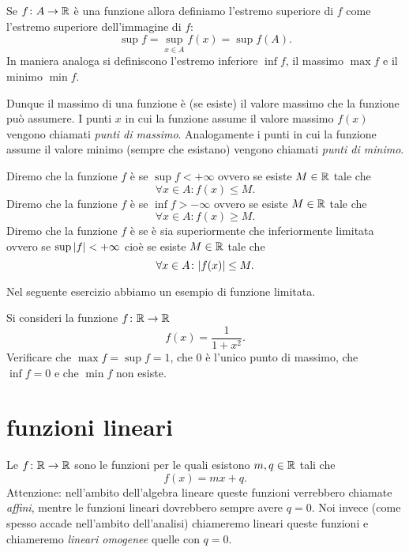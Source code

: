\begin{definition}
\label{def:funzione_limitata}%
Se $f\colon A \to \mathbb R$ è una funzione allora definiamo
l'estremo superiore di $f$ come l'estremo superiore
dell'immagine di $f$:
\[
  \sup f = \sup_{x\in A} f(x) = \sup f(A).
\]
In maniera analoga si definiscono l'estremo inferiore $\inf f$,
il massimo $\max f$ e il minimo $\min f$.

Dunque il massimo di una funzione è (se esiste) il valore massimo
che la funzione può assumere. I punti $x$ in cui
la funzione assume il valore massimo $f(x)$ vengono chiamati
\emph{punti di massimo}.
%
%
%
Analogamente i punti in cui la funzione
assume il valore minimo (sempre che esistano) vengono
chiamati \emph{punti di minimo}.

Diremo che la funzione $f$ è
se $\sup f<+\infty$
ovvero se esiste $M\in \mathbb R$ tale che
\[
\forall x\in A \colon f(x) \le M.
\]
Diremo che la funzione $f$ è
se $\inf f > -\infty$ ovvero se esiste $M\in \mathbb R$ tale che
\[
 \forall x \in A \colon f(x) \ge M.
\]
Diremo che la funzione $f$ è 
se è sia superiormente che inferiormente limitata ovvero
se $\sup{\left|f\right|}<+\infty$ cioè se esiste $M\in \mathbb R$ tale che
\[
\forall x \in A \colon {\left|f(x)\right|}\le M.
\]
\end{definition}

Nel seguente esercizio abbiamo un esempio di funzione limitata.
\begin{exercise}
Si consideri la funzione $f\colon \mathbb R\to\mathbb R$
\[
 f(x) = \frac{1}{1+x^2}.
\]
Verificare che $\max f = \sup f = 1$, che $0$ è l'unico punto di massimo,
che $\inf f = 0$ e che $\min f$ non esiste.
\end{exercise}

\section{funzioni lineari}

Le 
$f\colon \mathbb R \to \mathbb R$ sono le funzioni per le quali
esistono $m,q\in\mathbb R$ tali che
\[
  f(x) = mx + q.
\]
Attenzione: nell'ambito dell'algebra lineare queste
funzioni verrebbero chiamate \emph{affini}, mentre
le funzioni lineari dovrebbero sempre avere $q=0$.
Noi invece (come spesso accade nell'ambito dell'analisi)
chiameremo lineari queste funzioni e chiameremo
\emph{lineari omogenee} quelle con $q=0$.

